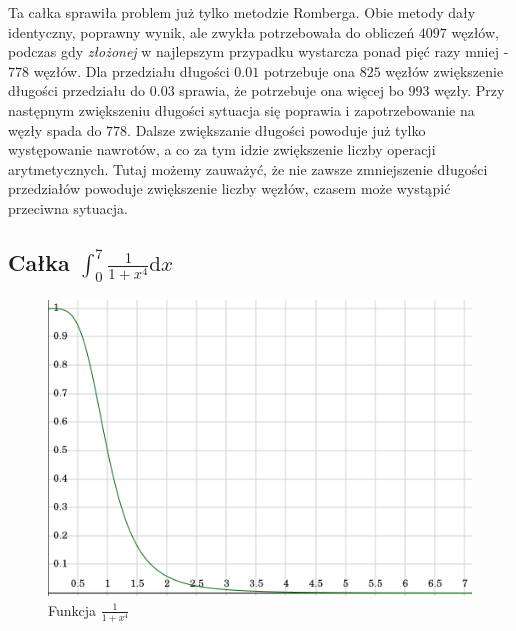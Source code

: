 \documentclass[11pt,leqno]{article}
\begin{document}
Ta całka sprawiła problem już tylko metodzie Romberga. Obie metody dały
identyczny, poprawny wynik, ale zwykła potrzebowała do obliczeń $4097$ węzłów,
podczas gdy \textit{złożonej} w najlepszym przypadku wystarcza ponad pięć razy
mniej - $778$ węzłów. Dla przedziału długości $0.01$ potrzebuje ona $825$
węzłów zwiększenie długości przedziału do $0.03$ sprawia, że potrzebuje ona
więcej bo $993$ węzły. Przy następnym zwiększeniu długości sytuacja się
poprawia i zapotrzebowanie na węzły spada do $778$. Dalsze zwiększanie długości
powoduje już tylko występowanie nawrotów, a co za tym idzie zwiększenie liczby
operacji arytmetycznych. Tutaj możemy zauważyć, że nie zawsze zmniejszenie
długości przedziałów powoduje zwiększenie liczby węzłów, czasem może wystąpić
przeciwna sytuacja.

\subsection{Całka $\int_{0}^{7}\frac{1}{1 + x^4}\mathrm{d}x$}
\begin{center}\begin{figure}[ht]\begin{center}
    \caption{Funkcja $\frac{1}{1 + x^4}$}
    \includegraphics[scale=0.3,angle=0]{poly.png}
\end{center}\end{figure}\end{center}
\end{document}
